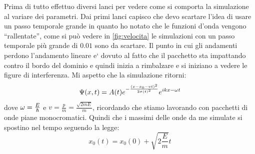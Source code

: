 Prima di tutto effettuo diversi lanci per vedere come si comporta la simulazione al variare dei parametri.
Dai primi lanci capisco che devo scartare l'idea di usare un passo temporale grande in quanto ho notato che le funzioni d'onda vengono ``rallentate'', come si pu\`o vedere in \autoref{fig:velocita} le simulazioni con un passo temporale pi\`u grande di $0.01$ sono da scartare. Il punto in cui gli andamenti perdono l'andamento lineare e` dovuto al fatto che il pacchetto sta impattando contro il bordo del dominio e quindi inizia a rimbalzare e si iniziano a vedere le figure di interferenza.
Mi aspetto che la simulazione ritorni:
\begin{equation}
\Psi(x,t) = A(t)e^{-\frac{\left( x-x_0- v t \right)^2}{2\sigma(t)^2}}e^{ikx-\omega t}
\end{equation}
dove $\omega = \frac E\hbar$  e $v = \frac{p}{m} =\frac{\sqrt{2m E}}{m} $, ricordando che stiamo lavorando con pacchetti di onde piane monocromatici.
Quindi che i massimi delle onde da me simulate si spostino nel tempo seguendo la legge:
\begin{equation}
x_0(t) = x_0(0)+\sqrt{2\frac{E}{m}} t
\end{equation}
